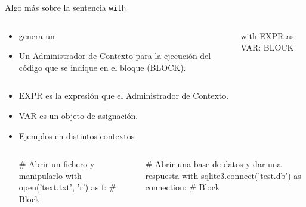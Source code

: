 \documentclass[10pt, envcountsect , spanish]{beamer}
\begin{document}
\begin{frame}[fragile]{Algo más sobre la sentencia {\tt with}} 

\begin{columns}

\begin{column}{.73\textwidth}
\begin{itemize}
\item {} genera un 
\item Un Administrador de Contexto  para la ejecución del código que se indique en el bloque (BLOCK).
\end{itemize}
\end{column}

\begin{column}{.24\textwidth}
{\small
\begin{pyverbatim}[][frame=single, fontsize=\scriptsize]
with EXPR as VAR:
    BLOCK

\end{pyverbatim}
}
\end{column}

\end{columns}



\begin{itemize}
\item EXPR es la expresión que  el Administrador de Contexto.
\item VAR es un objeto de asignación.
\item Ejemplos en distintos contextos

\begin{columns}

\begin{column}{.42\textwidth}
{\footnotesize
\begin{pyverbatim}[][frame=single, fontsize=\scriptsize]
# Abrir un fichero y manipularlo
with open('text.txt', 'r') as f:
  # Block
\end{pyverbatim}
}
\end{column}


\begin{column}{.58\textwidth}
{\footnotesize
\begin{pyverbatim}[][frame=single, fontsize=\scriptsize]
# Abrir una base de datos y dar una respuesta
with sqlite3.connect('test.db') as connection:
  # Block
\end{pyverbatim}
}
\end{column}


\end{columns}
\end{itemize}
\end{frame}
\end{document}
